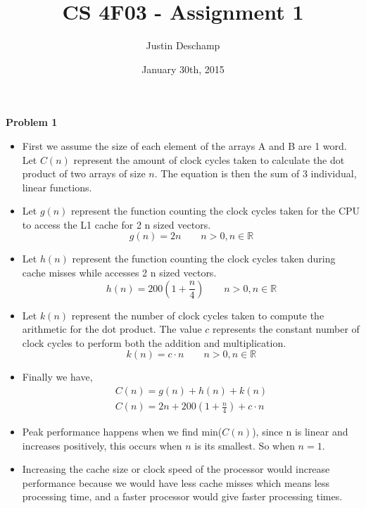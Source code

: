 \documentclass[12pt]{article}
\title{CS 4F03 - Assignment 1}
\author{Justin Deschamp}
\date{January 30th, 2015}
\begin{document}
\maketitle

\textbf{Problem 1}
\begin{itemize}

    \item[] First we assume the size of each element of the arrays A and B are
            1 word. Let $C(n)$ represent the amount of clock cycles taken
            to calculate the dot product of two arrays of size $n$. The
            equation is then the sum of 3 individual, linear functions.

    \item[] Let $g(n)$ represent the function counting the clock cycles taken
            for the CPU to access the L1 cache for 2 n sized vectors.
        \begin{equation}
            g(n) = 2n \qquad n > 0, n \in \mathbb{R}
        \end{equation}

    \item[] Let $h(n)$ represent the function counting the clock cycles taken
            during cache misses while accesses 2 n sized vectors.
        \begin{equation}
            h(n) = 200(1 + \frac{n}{4}) \qquad n > 0, n \in \mathbb{R}
        \end{equation}

    \item[] Let $k(n)$ represent the number of clock cycles taken to compute
            the arithmetic for the dot product. The value $c$ represents the
            constant number of clock cycles to perform both the addition and
            multiplication.
        \begin{equation}
            k(n) = c \cdot n \qquad n > 0, n \in \mathbb{R}
        \end{equation}

    \item[] Finally we have,
        \begin{equation}
            \begin{split}
                C(n) = g(n) + h(n) + k(n) \\
                C(n) = 2n + 200(1 + \frac{n}{4}) + c \cdot n
            \end{split}
        \end{equation}

    \item[] Peak performance happens when we find min($C(n)$), since n is
            linear and increases positively, this occurs when $n$ is its
            smallest. So when $n = 1$.

    \item[] Increasing the cache size or clock speed of the processor would
            increase performance because we would have less cache misses
            which means less processing time, and a faster processor would
            give faster processing times.

\end{itemize}
\end{document}
